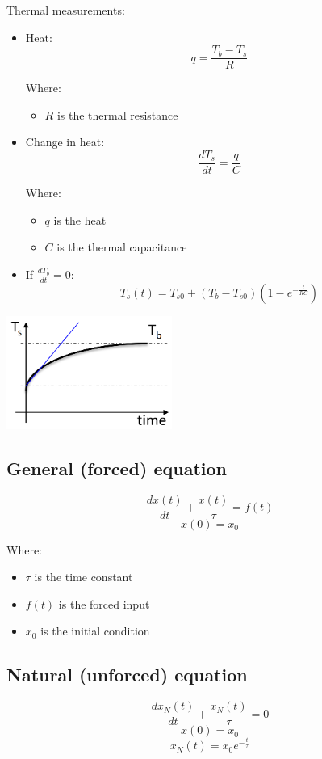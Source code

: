 \documentclass[11pt]{article}
\begin{document}
Thermal measurements:
\begin{itemize}
\item Heat:
\[q = \frac{T_b - T_s}{R}\]

Where:
\begin{itemize}
\item \(R\) is the thermal resistance
\end{itemize}
\item Change in heat:
\[\frac{dT_s}{dt} = \frac{q}{C}\]

Where:
\begin{itemize}
\item \(q\) is the heat
\item \(C\) is the thermal capacitance
\end{itemize}

\item If \(\frac{dT_b}{dt} = 0\):
\[T_s (t) = T_{s0} + (T_b - T_{s0}) (1 - e^{- \frac{t}{RC}})\]
\end{itemize}

\begin{center}
\includegraphics[height=10em]{./images/first-order-system-example-graph.png}
\end{center}
\subsection{General (forced) equation}
\label{sec:orga2904d2}
\[\frac{dx (t)}{dt} + \frac{x(t)}{\tau} = f(t)\]
\[x(0) = x_0\]

Where:
\begin{itemize}
\item \(\tau\) is the time constant
\item \(f(t)\) is the forced input
\item \(x_0\) is the initial condition
\end{itemize}
\subsection{Natural (unforced) equation}
\label{sec:orge84b4ea}
\[\frac{dx_N (t)}{dt} + \frac{x_N (t)}{\tau} = 0\]
\[x(0) = x_0\]
\[x_N (t) = x_0 e^{-\frac{t}{\tau}}\]
\end{document}
